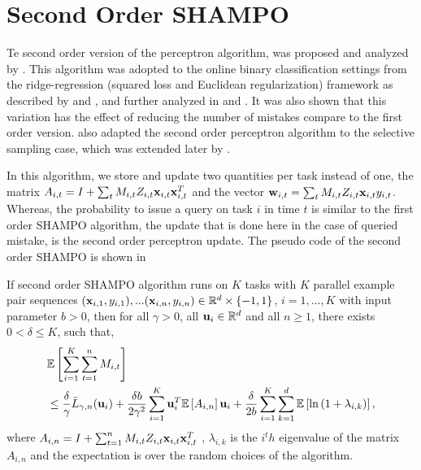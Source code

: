 \section{Second Order SHAMPO}
Te second order version of the perceptron algorithm, was proposed and analyzed by 
\cite{CesaBianchiCoGe05}. This algorithm was adopted to the online binary classification 
settings from the ridge-regression (squared loss and Euclidean regularization) framework as described by 
\cite{hoerl1970ridge} and \cite{Vovk97}, and further analyzed in \cite{AzouryWa01} and  \cite{forster2002relative}. 
It was also shown that this variation has the effect of reducing the number of mistakes compare to the first order version. 
\cite{DBLP:journals/jmlr/Cesa-BianchiGZ06a} also adapted the second order 
perceptron algorithm to the selective sampling case, which was extended later by \cite{crammer2014doubly}.

In this algorithm, we store and update two quantities per task instead of one, the matrix 
$A_{i,t} = I+\sum_{t}M_{i,t}Z_{i,t}\mathbf{x}_{i,t}\mathbf{x}_{i,t}^T$ and the vector $\mathbf{w}_{i,t} = \sum_{t}M_{i,t}Z_{i,t} \mathbf{x}_{i,t}  y_{i,t}$.
Whereas, the probability to issue a query on task $i$ in time $t$ is similar to the first order SHAMPO algorithm,
the update  that is done here in the case of queried mistake, is the second order perceptron update.  
The pseudo code of the second order SHAMPO is shown in 


\begin{theorem}
  If second order SHAMPO algorithm runs on $K$ tasks with $K$ parallel example pair
  sequences
  $(\mathbf{x}_{i,1},y_{i,1}),...(\mathbf{x}_{i,n},y_{i,n})\in\mathbb{R}^d\times\{-1,1\}$,
  $i=1,...,K$ with input parameter $b>0$, then for all $\gamma>0$, all
  $\mathbf{u}_{i}\in\mathbb{R}^d$ and all $n\ge1$, there exists $0<\delta\le K$, such that,
  \begin{equation*}
  \begin{split}
   &\mathbb{E}\left[{\sum_{i=1}^{K}\sum_{t=1}^{n}{M_{i,t}}}\right] \\
   &\le \frac{\delta}{\gamma}{\bar L}_{\gamma,n}(\mathbf{u}_{i})
+ \frac{\delta b}{2\gamma^2}\sum_{i=1}^{K}\mathbf{u}_i^T\mathbb{E}\left[{A_{i,n}}\right]\mathbf{u}_i+ 
\frac{\delta}{2b}\sum_{i=1}^{K}\sum_{k=1}^{d}\mathbb{E}\left[{\ln\left({1+\lambda_{i,k}}\right)}\right],
\end{split}
\end{equation*} 
 where $A_{i,n} = I+\sum_{t=1}^{n}M_{i,t}Z_{i,t}\mathbf{x}_{i,t}\mathbf{x}_{i,t}^T$ , $\lambda_{i,k}$ is the $i^th$ eigenvalue
 of the matrix $A_{i,n}$ and the expectation is over the random choices of the algorithm.
\end{theorem} \label{thm:SO_bound}

